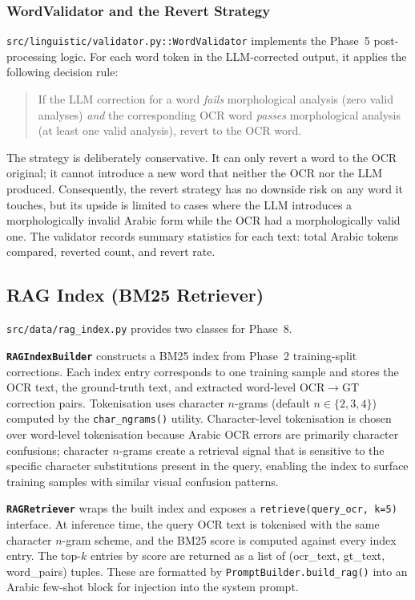 \subsubsection{WordValidator and the Revert Strategy}

\texttt{src/linguistic/validator.py::WordValidator} implements the Phase~5
post-processing logic.
For each word token in the LLM-corrected output, it applies the following
decision rule:

\begin{quote}
If the LLM correction for a word \emph{fails} morphological analysis (zero valid
analyses) \emph{and} the corresponding OCR word \emph{passes} morphological
analysis (at least one valid analysis), revert to the OCR word.
\end{quote}

\noindent
The strategy is deliberately conservative.
It can only revert a word to the OCR original; it cannot introduce a new word
that neither the OCR nor the LLM produced.
Consequently, the revert strategy has no downside risk on any word it touches,
but its upside is limited to cases where the LLM introduces a morphologically
invalid Arabic form while the OCR had a morphologically valid one.
The validator records summary statistics for each text: total Arabic tokens
compared, reverted count, and revert rate.

\subsection{RAG Index (BM25 Retriever)}
\label{subsec:kb_rag}

\texttt{src/data/rag\_index.py} provides two classes for Phase~8.

\textbf{\texttt{RAGIndexBuilder}} constructs a BM25 index from Phase~2
training-split corrections. Each index entry corresponds to one training
sample and stores the OCR text, the ground-truth text, and extracted
word-level OCR$\to$GT correction pairs. Tokenisation uses character
$n$-grams (default $n \in \{2,3,4\}$) computed by the \texttt{char\_ngrams()}
utility. Character-level tokenisation is chosen over word-level tokenisation
because Arabic OCR errors are primarily character confusions; character
$n$-grams create a retrieval signal that is sensitive to the specific
character substitutions present in the query, enabling the index to surface
training samples with similar visual confusion patterns.

\textbf{\texttt{RAGRetriever}} wraps the built index and exposes a
\texttt{retrieve(query\_ocr, k=5)} interface. At inference time, the query
OCR text is tokenised with the same character $n$-gram scheme, and the
BM25 score is computed against every index entry. The top-$k$ entries by
score are returned as a list of (ocr\_text, gt\_text, word\_pairs) tuples.
These are formatted by \texttt{PromptBuilder.build\_rag()} into an Arabic
few-shot block for injection into the system prompt.

